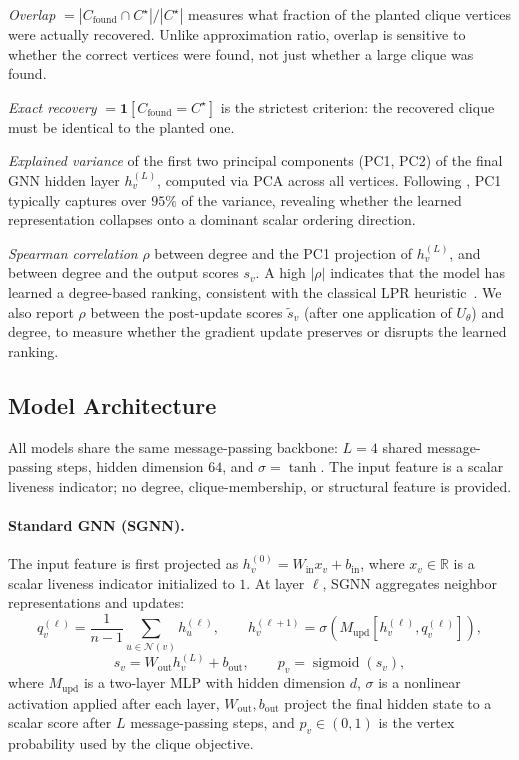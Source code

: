 \documentclass[11pt]{article}
\theoremstyle{plain}
\theoremstyle{remark}
\begin{document}
\textit{Overlap} $= |C_{\text{found}} \cap C^\star|/|C^\star|$ measures what
fraction of the planted clique vertices were actually recovered. Unlike approximation
ratio, overlap is sensitive to whether the correct vertices were found, not just
whether a large clique was found.

\textit{Exact recovery} $= \mathbf{1}[C_{\text{found}} = C^\star]$ is the strictest
criterion: the recovered clique must be identical to the planted one.

\textit{Explained variance} of the first two principal components (PC1, PC2) of the
final GNN hidden layer $h_v^{(L)}$, computed via PCA across all vertices. Following
\citet{shoham2026ltr}, PC1 typically captures over $95\%$ of the variance,
revealing whether the learned representation collapses onto a dominant scalar
ordering direction.

\textit{Spearman correlation} $\rho$ between degree and the PC1 projection of
$h_v^{(L)}$, and between degree and the output scores $s_v$. A high $|\rho|$
indicates that the model has learned a degree-based ranking, consistent with the
classical LPR heuristic~\citep{shoham2026ltr}. We also report $\rho$ between the
post-update scores $\tilde{s}_v$ (after one application of $U_\theta$) and degree,
to measure whether the gradient update preserves or disrupts the learned ranking.

\subsection{Model Architecture}
\label{sec:architectures}

All models share the same message-passing backbone: $L=4$ shared message-passing
steps, hidden dimension $64$, and $\sigma=\tanh$. The input feature is a scalar
liveness indicator; no degree, clique-membership, or structural feature is provided.

\paragraph{Standard GNN (SGNN).}
The input feature is first projected as $h_v^{(0)} = W_{\mathrm{in}} x_v + b_{\mathrm{in}}$,
where $x_v \in \mathbb{R}$ is a scalar liveness indicator initialized to $1$. At layer $\ell$, SGNN
aggregates neighbor representations and updates:
\[
  q_v^{(\ell)} = \frac{1}{n-1}\sum_{u\in\mathcal{N}(v)} h_u^{(\ell)},
  \qquad
  h_v^{(\ell+1)} = \sigma\!\left(M_{\mathrm{upd}}\!\left[h_v^{(\ell)},
  q_v^{(\ell)}\right]\right),
\]
\[
  s_v = W_{\mathrm{out}} h_v^{(L)} + b_{\mathrm{out}},
  \qquad
  p_v = \operatorname{sigmoid}(s_v),
\]
where $M_{\mathrm{upd}}$ is a two-layer MLP with hidden dimension $d$, $\sigma$
is a nonlinear activation applied after each layer, $W_{\mathrm{out}}, b_{\mathrm{out}}$
project the final hidden state to a scalar score after $L$ message-passing steps,
and $p_v \in (0,1)$ is the vertex probability used by the clique objective.
\end{document}
